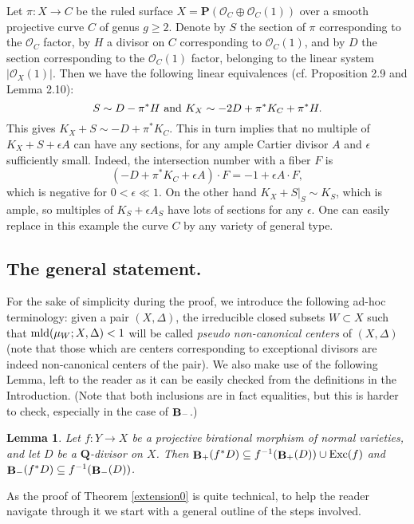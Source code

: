 \documentclass[11pt]{amsart}
\theoremstyle{plain}
\newtheorem{lemma}[theorem]{Lemma}
\theoremstyle{definition}
\newcommand{\PP}{\mathbf{P}}
\newcommand{\QQ}{\mathbf{Q}}
\newcommand{\OO}{\mathcal  {O}}
\DeclareMathOperator{\BB}{{\bf B}}
\begin{document}
Let $\pi : X \rightarrow C$ be the ruled surface $X = \PP ( \OO_C \oplus \OO_C (1))$ over a smooth projective curve $C$ of genus $g \ge 2$. Denote by $S$ the section of $\pi$ corresponding to the $\OO_C$ factor, by $H$ a divisor 
on $C$ corresponding to $\OO_C(1)$, and by $D$ the section corresponding to the $\OO_C(1)$ factor, belonging 
to the linear system $|\OO_X(1)|$. Then we have the following linear equivalences (cf. \cite{hartshorne} Proposition 2.9  and Lemma 2.10):
$$S \sim D - \pi^* H {\rm ~and ~} K_X \sim -2D + \pi^* K_C + \pi^* H.$$ 
This gives $K_X + S \sim - D + \pi^* K_C$. This in turn implies that no multiple of $K_X + S + \epsilon A$ can 
have any sections, for any ample Cartier divisor $A$ and $\epsilon$ sufficiently small. Indeed, the intersection 
number with a fiber $F$ is 
$$ (- D + \pi^* K_C + \epsilon A) \cdot F = - 1 + \epsilon A \cdot F, $$
which is negative for $0 < \epsilon \ll 1$. 
On the other hand $K_X + S|_{S} \sim K_S$, which is ample, so multiples of $K_S + \epsilon A_S$ have lots of 
sections for any $\epsilon$.
One can easily replace in this example the curve $C$ by any variety of general type.


\subsection*{The general statement.} 
For the sake of simplicity during the proof, we introduce the following ad-hoc terminology: given a 
pair $(X, \Delta)$, the irreducible closed subsets $W \subset X$ such that ${\rm mld}(\mu_W; X, \Delta) <1$ will be called \emph{pseudo non-canonical centers} of $(X, \Delta)$ (note that those which are centers corresponding to exceptional divisors are indeed non-canonical centers of the pair).
We also make use of the following Lemma, left to the reader as it can be easily checked from the definitions in the Introduction. (Note that both inclusions are in fact equalities, but this is harder to check, especially in the case of $\BB_{-}$.)

\begin{lemma}\label{inclusions}
Let $f: Y \rightarrow X$ be a projective birational morphism of normal varieties, and let $D$ be a 
$\QQ$-divisor on $X$. Then $\BB_{+}(f^* D) \subseteq f^{-1}(\BB_{+} (D)) \cup {\rm Exc}(f)$ and 
$\BB_{-} (f^*D) \subseteq f^{-1}(\BB_{-} (D))$.
\end{lemma}

As the proof of Theorem \ref{extension0} is quite technical, to help the reader navigate through it we start with a general outline of the steps involved. 
\end{document}
